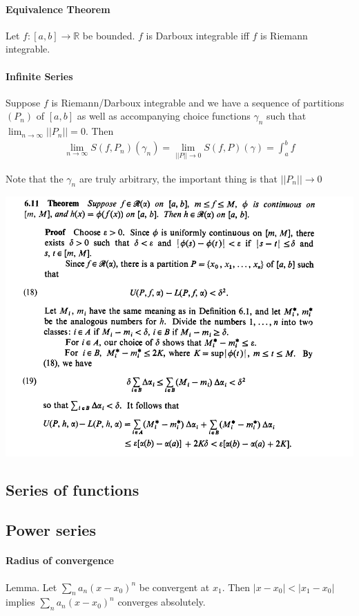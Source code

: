 \documentclass{article}
\begin{document}
\paragraph{Equivalence Theorem}
Let $f:[a,b]\rightarrow \mathbb{R}$ be bounded. $f$ is Darboux integrable iff $f$ is Riemann integrable.

\paragraph{Infinite Series}
Suppose $f$ is Riemann/Darboux integrable and we have a sequence of partitions $(P_n)$ of $[a,b]$ as well as accompanying choice functions $\gamma_n$ such that $\lim_{n\rightarrow \infty}||P_n||=0$.
Then
\begin{align*}
	\lim_{n\rightarrow \infty} S(f, P_n)(\gamma_n) = \lim_{||P||\rightarrow 0} S(f, P)(\gamma) = \int_a^bf
\end{align*}

Note that the $\gamma_n$ are truly arbitrary, the important thing is that $||P_n||\rightarrow 0$


\includegraphics[scale=0.8]{theorem_6_11}

\subsection{Series of functions}

\subsection{Power series}

\paragraph{Radius of convergence}
Lemma. Let $\sum_n a_n(x-x_0)^n$ be convergent at $x_1$. Then $|x-x_0| < |x_1-x_0|$ implies $\sum_n a_n(x-x_0)^n$ converges absolutely.
\end{document}
